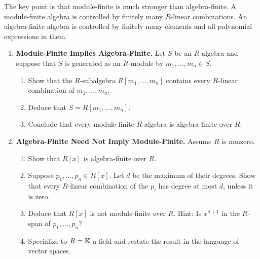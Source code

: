 \documentclass[12pt,reqno]{amsart}
\begin{document}
The key point is that module-finite is much stronger than algebra-finite. A module-finite algebra is controlled by finitely many $R$-linear combinations. An algebra-finite algebra is controlled by finitely many elements and all polynomial expressions in them.

\hrulefill

\begin{enumerate}[leftmargin=*, resume=problems]

\item \textbf{Module-Finite Implies Algebra-Finite.} Let $S$ be an $R$-algebra and suppose that $S$ is generated as an $R$-module by $m_1,\ldots,m_n\in S$.
\begin{enumerate}
    \item Show that the $R$-subalgebra $R[m_1,\ldots,m_n]$ contains every $R$-linear combination of $m_1,\ldots,m_n$.
    \item Deduce that $S=R[m_1,\ldots,m_n]$.
    \item Conclude that every module-finite $R$-algebra is algebra-finite over $R$.
\end{enumerate}

\item \textbf{Algebra-Finite Need Not Imply Module-Finite.} Assume $R$ is nonzero.
\begin{enumerate}
    \item Show that $R[x]$ is algebra-finite over $R$.
    \item Suppose $p_1,\ldots,p_n\in R[x]$. Let $d$ be the maximum of their degrees. Show that every $R$-linear combination of the $p_i$ has degree at most $d$, unless it is zero.
    \item Deduce that $R[x]$ is not module-finite over $R$. Hint: Is $x^{d+1}$ in the $R$-span of $p_1,\ldots,p_n$?
    \item Specialize to $R=\mathbb{K}$ a field and restate the result in the language of vector spaces.
\end{enumerate}


\end{enumerate}
\end{document}
